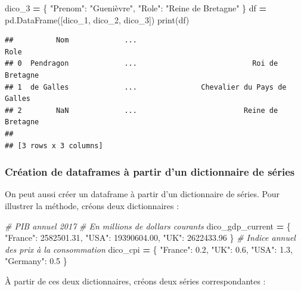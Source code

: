 \documentclass[12pt,]{book}
\newenvironment{Shaded}{\begin{snugshade}}{\end{snugshade}}
\newcommand{\FloatTok}[1]{\textcolor[rgb]{0.00,0.00,0.81}{#1}}
\newcommand{\StringTok}[1]{\textcolor[rgb]{0.31,0.60,0.02}{#1}}
\newcommand{\CommentTok}[1]{\textcolor[rgb]{0.56,0.35,0.01}{\textit{#1}}}
\newcommand{\OperatorTok}[1]{\textcolor[rgb]{0.81,0.36,0.00}{\textbf{#1}}}
\newcommand{\BuiltInTok}[1]{#1}
\newcommand{\NormalTok}[1]{#1}
\numberwithin{equation}{section}
\numberwithin{countremarque}{section}
\begin{document}
\begin{Shaded}
\begin{Highlighting}[]
\NormalTok{dico_3 }\OperatorTok{=}\NormalTok{ \{}
    \StringTok{"Prenom"}\NormalTok{: }\StringTok{"Guenièvre"}\NormalTok{,}
    \StringTok{"Role"}\NormalTok{: }\StringTok{"Reine de Bretagne"}
\NormalTok{\}}
\NormalTok{df }\OperatorTok{=}\NormalTok{ pd.DataFrame([dico_1, dico_2, dico_3])}
\BuiltInTok{print}\NormalTok{(df)}
\end{Highlighting}
\end{Shaded}

\begin{lstlisting}
##          Nom             ...                                      Role
## 0  Pendragon             ...                           Roi de Bretagne
## 1  de Galles             ...               Chevalier du Pays de Galles
## 2        NaN             ...                         Reine de Bretagne
## 
## [3 rows x 3 columns]
\end{lstlisting}

\subsubsection{Création de dataframes à partir d'un dictionnaire de
séries}\label{creation-de-dataframes-a-partir-dun-dictionnaire-de-series}

On peut aussi créer un dataframe à partir d'un dictionnaire de séries.
Pour illustrer la méthode, créons deux dictionnaires :

\begin{Shaded}
\begin{Highlighting}[]
\CommentTok{# PIB annuel 2017}
\CommentTok{# En millions de dollars courants}
\NormalTok{dico_gdp_current }\OperatorTok{=}\NormalTok{ \{}
    \StringTok{"France"}\NormalTok{: }\FloatTok{2582501.31}\NormalTok{,}
    \StringTok{"USA"}\NormalTok{: }\FloatTok{19390604.00}\NormalTok{,}
    \StringTok{"UK"}\NormalTok{: }\FloatTok{2622433.96}
\NormalTok{\}}
\CommentTok{# Indice annuel des prix à la consommation}
\NormalTok{dico_cpi }\OperatorTok{=}\NormalTok{ \{}
    \StringTok{"France"}\NormalTok{: }\FloatTok{0.2}\NormalTok{,}
    \StringTok{"UK"}\NormalTok{: }\FloatTok{0.6}\NormalTok{,}
    \StringTok{"USA"}\NormalTok{: }\FloatTok{1.3}\NormalTok{,}
    \StringTok{"Germany"}\NormalTok{: }\FloatTok{0.5}
\NormalTok{\}}
\end{Highlighting}
\end{Shaded}

À partir de ces deux dictionnaires, créons deux séries correspondantes :
\end{document}
